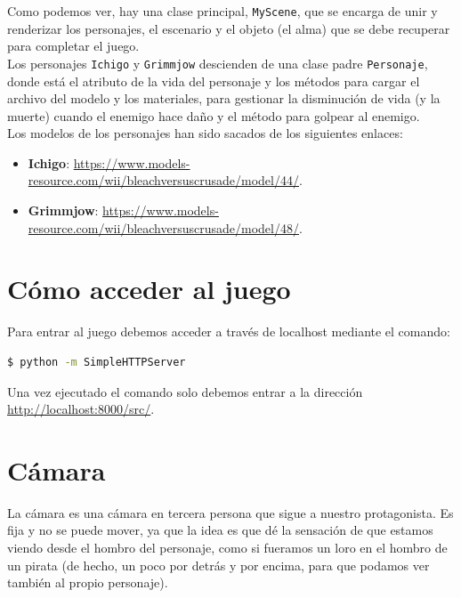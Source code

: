 \documentclass[11pt,a4paper]{article}
\begin{document}
Como podemos ver, hay una clase principal, \texttt{MyScene}, que se encarga de unir y renderizar los personajes, el escenario y el objeto (el alma) que se debe recuperar para completar el juego.\\

Los personajes \texttt{Ichigo} y \texttt{Grimmjow} descienden de una clase padre \texttt{Personaje}, donde está el atributo de la vida del personaje y los métodos para cargar el archivo del modelo y los materiales, para gestionar la disminución de vida (y la muerte) cuando el enemigo hace daño y el método para golpear al enemigo.\\

Los modelos de los personajes han sido sacados de los siguientes enlaces:

\begin{itemize}
	\item \textbf{Ichigo}: \color{blue}\url{https://www.models-resource.com/wii/bleachversuscrusade/model/44/}\color{black}.
	\item \textbf{Grimmjow}: \color{blue}\url{https://www.models-resource.com/wii/bleachversuscrusade/model/48/}\color{black}.
\end{itemize}

\section{Cómo acceder al juego}

Para entrar al juego debemos acceder a través de localhost mediante el comando:

\begin{lstlisting}[language=bash]
$ python -m SimpleHTTPServer
\end{lstlisting}

Una vez ejecutado el comando solo debemos entrar a la dirección \color{blue}\url{http://localhost:8000/src/}\color{black}.

\section{Cámara}

La cámara es una cámara en tercera persona que sigue a nuestro protagonista. Es fija y no se puede mover, ya que la idea es que dé la sensación de que estamos viendo desde el hombro del personaje, como si fueramos un loro en el hombro de un pirata (de hecho, un poco por detrás y por encima, para que podamos ver también al propio personaje).\\
\end{document}
